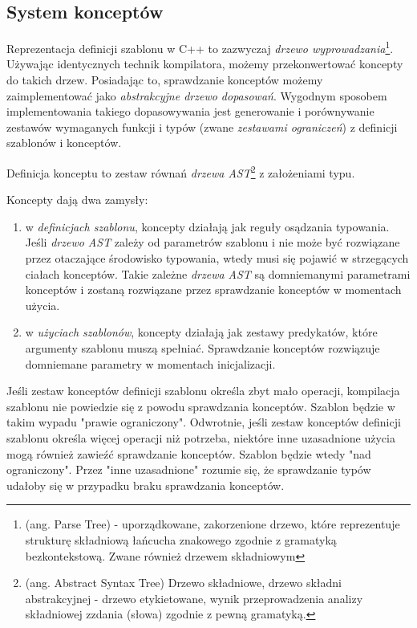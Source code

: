 \documentclass[11pt, a4paper]{article}
\begin{document}
\lstset{language=C++}

\subsection{System konceptów}

Reprezentacja definicji szablonu w C++ to zazwyczaj \emph{drzewo wyprowadzania}\footnote{(ang. Parse Tree) - uporządkowane, zakorzenione drzewo, które reprezentuje strukturę składniową łańcucha znakowego zgodnie z gramatyką bezkontekstową. Zwane również drzewem składniowym}. Używając identycznych technik kompilatora, możemy przekonwertować koncepty do takich drzew. Posiadając to, sprawdzanie konceptów możemy zaimplementować jako \emph{abstrakcyjne drzewo dopasowań}. Wygodnym sposobem implementowania takiego dopasowywania jest generowanie i porównywanie zestawów wymaganych funkcji i typów (zwane \emph{zestawami ograniczeń}) z definicji szablonów i konceptów.

Definicja konceptu to zestaw równań \emph{drzewa AST}\footnote{(ang. Abstract Syntax Tree) Drzewo składniowe, drzewo składni abstrakcyjnej - drzewo etykietowane, wynik przeprowadzenia analizy składniowej zzdania (słowa) zgodnie z pewną gramatyką.} z założeniami typu. \newline

Koncepty dają dwa zamysły:

\begin{enumerate}

\item w \emph{definicjach szablonu}, koncepty działają jak reguły osądzania typowania. Jeśli \emph{drzewo AST} zależy od parametrów szablonu i nie może być rozwiązane przez otaczające środowisko typowania, wtedy musi się pojawić w strzegących ciałach konceptów. Takie zależne \emph{drzewa AST} są domniemanymi parametrami konceptów i zostaną rozwiązane przez sprawdzanie konceptów w momentach użycia.

\item w \emph{użyciach szablonów}, koncepty działają jak zestawy predykatów, które argumenty szablonu muszą spełniać. Sprawdzanie konceptów rozwiązuje domniemane parametry w momentach inicjalizacji.

\end{enumerate}

Jeśli zestaw konceptów definicji szablonu określa zbyt mało operacji, kompilacja szablonu nie powiedzie się z powodu sprawdzania konceptów. Szablon będzie w takim wypadu "prawie ograniczony". Odwrotnie, jeśli zestaw konceptów definicji szablonu określa więcej operacji niż potrzeba, niektóre inne uzasadnione użycia mogą również zawieźć sprawdzanie konceptów. Szablon będzie wtedy "nad ograniczony". Przez "inne uzasadnione" rozumie się, że sprawdzanie typów udałoby się w przypadku braku sprawdzania konceptów.
\end{document}
